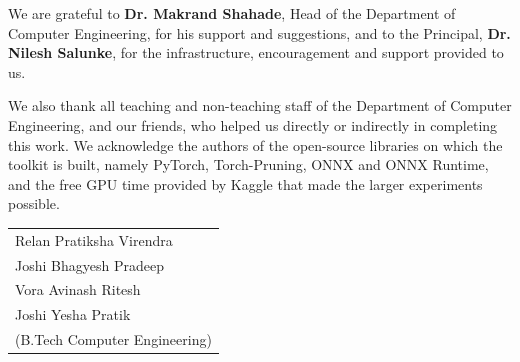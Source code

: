 \documentclass[oneside,a4paper,12pt]{report}
\newcommand{\StudentA}{Relan Pratiksha Virendra}
\newcommand{\StudentB}{Joshi Bhagyesh Pradeep}
\newcommand{\StudentC}{Vora Avinash Ritesh}
\newcommand{\StudentD}{Joshi Yesha Pratik}
\newcommand{\Hod}{Dr. Makrand Shahade}
\newcommand{\Principal}{Dr. Nilesh Salunke}
\begin{document}
We are grateful to \textbf{\Hod}, Head of the Department of Computer Engineering, for his support and suggestions, and to the Principal, \textbf{\Principal}, for the infrastructure, encouragement and support provided to us.

We also thank all teaching and non-teaching staff of the Department of Computer Engineering, and our friends, who helped us directly or indirectly in completing this work. We acknowledge the authors of the open-source libraries on which the toolkit is built, namely PyTorch, Torch-Pruning, ONNX and ONNX Runtime, and the free GPU time provided by Kaggle that made the larger experiments possible.

\vspace{1.6cm}
\hfill\begin{tabular}{@{}l@{}}
\StudentA\\ \StudentB\\ \StudentC\\ \StudentD\\ (B.Tech Computer Engineering)
\end{tabular}
\newpage
\end{document}
